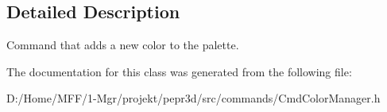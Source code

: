 \subsection{Detailed Description}
Command that adds a new color to the palette. 

The documentation for this class was generated from the following file\+:\begin{DoxyCompactItemize}
\item 
D\+:/\+Home/\+M\+F\+F/1-\/\+Mgr/projekt/pepr3d/src/commands/Cmd\+Color\+Manager.\+h\end{DoxyCompactItemize}
